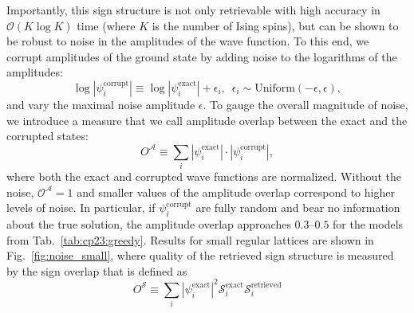 Importantly, this sign structure is not only retrievable with high accuracy in $\mathcal{O}(K \log K)$ time (where $K$ is the number of Ising spins), but can be shown to be robust to noise in the amplitudes of the wave function. To this end, we corrupt amplitudes of the ground state by adding noise to the logarithms of the amplitudes:
\begin{equation}
    \log \left|\psi^\mathrm{corrupt}_i\right| \equiv \log \left|\psi^\mathrm{exact}_i\right| + \epsilon_i, \,\,\, \epsilon_i \sim \mbox{Uniform}(-\epsilon, \epsilon ), 
\end{equation}
and vary the maximal noise amplitude $\epsilon$. To gauge the overall magnitude of noise, we introduce a measure that we call amplitude overlap between the exact and the corrupted states:
\begin{equation}
    O^\mathcal{A} \equiv \sum_i |\psi^\mathrm{exact}_i|\cdot |\psi^\mathrm{corrupt}_i|,
\end{equation}
where both the exact and corrupted wave functions are normalized. Without the noise, $\mathcal{O}^\mathcal{A} = 1$ and smaller values of the amplitude overlap correspond to higher levels of noise. In particular, if $\psi^\mathrm{corrupt}_i$ are fully random and bear no information about the true solution, the amplitude overlap approaches $0.3$--$0.5$ for the models from Tab.~\ref{tab:cp23:greedy}. Results for small regular lattices are shown in Fig.~\ref{fig:noise_small}, where quality of the retrieved sign structure is measured by the sign overlap that is defined as
\begin{equation}
    O^\mathcal{S} \equiv  \sum_i |\psi^\mathrm{exact}_i|^2 \mathcal{S}_i^\mathrm{exact}\mathcal{S}_i^\mathrm{retrieved}
\end{equation}



